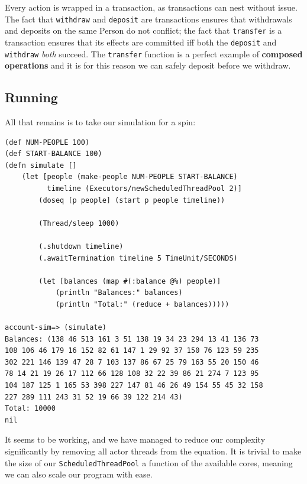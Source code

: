 \documentclass[a4paper,12pt]{kth-mag}
\begin{document}
Every action is wrapped in a transaction, as transactions can nest without issue. The fact that \texttt{withdraw} and \texttt{deposit} are transactions ensures that withdrawals and deposits on the same Person do not conflict; the fact that \texttt{transfer} is a transaction ensures that its effects are committed iff both the \texttt{deposit} and \texttt{withdraw} \textit{both} succeed. The \texttt{transfer} function is a perfect example of \textbf{composed operations} and it is for this reason we can safely deposit before we withdraw.

\subsection{Running}

All that remains is to take our simulation for a spin:

\begin{listing}[H]
	\begin{verbatim}
(def NUM-PEOPLE 100)
(def START-BALANCE 100)
(defn simulate []
    (let [people (make-people NUM-PEOPLE START-BALANCE)
          timeline (Executors/newScheduledThreadPool 2)]
        (doseq [p people] (start p people timeline))
        
        (Thread/sleep 1000)
        
        (.shutdown timeline)
        (.awaitTermination timeline 5 TimeUnit/SECONDS)
        
        (let [balances (map #(:balance @%) people)]
            (println "Balances:" balances)
            (println "Total:" (reduce + balances)))))
            
account-sim=> (simulate)
Balances: (138 46 513 161 3 51 138 19 34 23 294 13 41 136 73 
108 106 46 179 16 152 82 61 147 1 29 92 37 150 76 123 59 235 
302 221 146 139 47 28 7 103 137 86 67 25 79 163 55 20 150 46 
78 14 21 19 26 17 112 66 128 108 32 22 39 86 21 274 7 123 95 
104 187 125 1 165 53 398 227 147 81 46 26 49 154 55 45 32 158 
227 289 111 243 31 52 19 66 39 122 214 43)
Total: 10000
nil
	\end{verbatim}
\end{listing}

It seems to be working, and we have managed to reduce our complexity significantly by removing all actor threads from the equation. It is trivial to make the size of our \texttt{ScheduledThreadPool} a function of the available cores, meaning we can also scale our program with ease.
\end{document}

